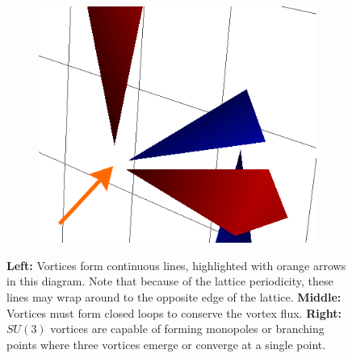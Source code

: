 \begin{figure}[htb!]
\begin{subfigure}[b]{0.3\textwidth}
    \end{subfigure}\hfill
    \begin{subfigure}[b]{0.3\textwidth}
	\includegraphics[width=\textwidth]{./plaqt1_monopole.png}
    \end{subfigure}
    \caption[Examples of the properties of projected vortices.]{\label{fig:VortexFeatures} \textbf{Left:} Vortices form continuous lines, highlighted with orange arrows in this diagram. Note that because of the lattice periodicity, these lines may wrap around to the opposite edge of the lattice. \textbf{Middle:} Vortices must form closed loops to conserve the vortex flux. \textbf{Right:} $SU(3)$ vortices are capable of forming monopoles or branching points where three vortices emerge or converge at a single point.}
\end{figure}

